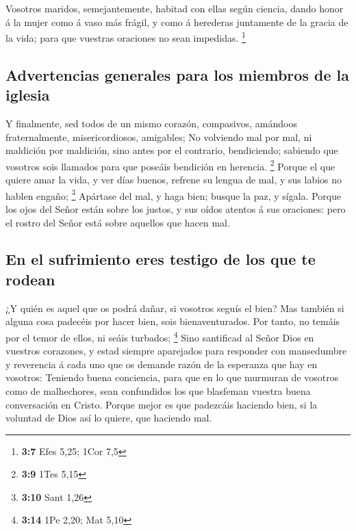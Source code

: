  Vosotros maridos, semejantemente, habitad con ellas según
ciencia, dando honor á la mujer como á vaso más frágil, y como á
herederas juntamente de la gracia de la vida; para que vuestras
oraciones no sean impedidas. \footnote{\textbf{3:7} Efes 5,25; 1Cor 7,5}

\hypertarget{advertencias-generales-para-los-miembros-de-la-iglesia}{%
\subsection{Advertencias generales para los miembros de la
iglesia}\label{advertencias-generales-para-los-miembros-de-la-iglesia}}

 Y finalmente, sed todos de un mismo corazón, compasivos,
amándoos fraternalmente, misericordiosos, amigables;  No
volviendo mal por mal, ni maldición por maldición, sino antes por el
contrario, bendiciendo; sabiendo que vosotros sois llamados para que
poseáis bendición en herencia. \footnote{\textbf{3:9} 1Tes 5,15}
 Porque el que quiere amar la vida, y ver días buenos,
refrene su lengua de mal, y sus labios no hablen engaño; \footnote{\textbf{3:10}
  Sant 1,26}  Apártase del mal, y haga bien; busque la
paz, y sígala.  Porque los ojos del Señor están sobre los
justos, y sus oídos atentos á sus oraciones: pero el rostro del Señor
está sobre aquellos que hacen mal.

\hypertarget{en-el-sufrimiento-eres-testigo-de-los-que-te-rodean}{%
\subsection{En el sufrimiento eres testigo de los que te
rodean}\label{en-el-sufrimiento-eres-testigo-de-los-que-te-rodean}}

 ¿Y quién es aquel que os podrá dañar, si vosotros seguís
el bien?  Mas también si alguna cosa padecéis por hacer
bien, sois bienaventurados. Por tanto, no temáis por el temor de ellos,
ni seáis turbados; \footnote{\textbf{3:14} 1Pe 2,20; Mat 5,10}
 Sino santificad al Señor Dios en vuestros corazones, y
estad siempre aparejados para responder con mansedumbre y reverencia á
cada uno que os demande razón de la esperanza que hay en vosotros:
 Teniendo buena conciencia, para que en lo que murmuran
de vosotros como de malhechores, sean confundidos los que blasfeman
vuestra buena conversación en Cristo.  Porque mejor es
que padezcáis haciendo bien, si la voluntad de Dios así lo quiere, que
haciendo mal.

